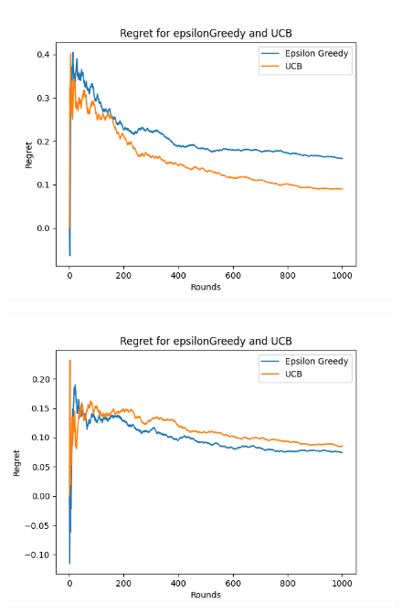 \begin{figure}[h]
	\centering
	\begin{minipage}{.33\textwidth}
	  \centering
	  \includegraphics[width=\linewidth]{Images/regret_1000_UCB.png}
	  \label{fig:UCB_1000}
	\end{minipage}%
	\begin{minipage}{.33\textwidth}
	  \centering
	  \includegraphics[width=\linewidth]{Images/regret_1000_epsilon.png}
	  \label{fig:epsilon_1000}
	\end{minipage}
	\begin{minipage}{.33\textwidth}
		\centering

\end{minipage}
\end{figure}
